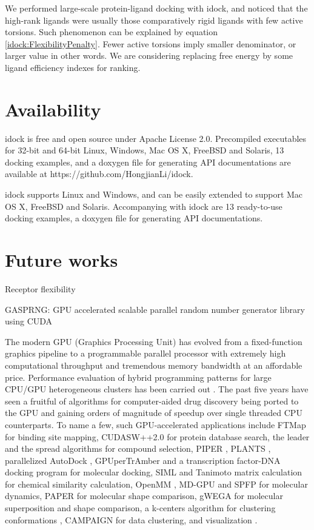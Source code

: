 We performed large-scale protein-ligand docking with idock, and noticed that the high-rank ligands were usually those comparatively rigid ligands with few active torsions. Such phenomenon can be explained by equation \eqref{idock:FlexibilityPenalty}. Fewer active torsions imply smaller denominator, or larger value in other words. We are considering replacing free energy by some ligand efficiency indexes \citep{335,336,337} for ranking.

\section{Availability}

idock is free and open source under Apache License 2.0. Precompiled executables for 32-bit and 64-bit Linux, Windows, Mac OS X, FreeBSD and Solaris, 13 docking examples, and a doxygen file for generating API documentations are available at https://github.com/HongjianLi/idock.

idock supports Linux and Windows, and can be easily extended to support Mac OS X, FreeBSD and Solaris. Accompanying with idock are 13 ready-to-use docking examples, a doxygen file for generating API documentations.

\section{Future works}

Receptor flexibility

\citep{1401} GASPRNG: GPU accelerated scalable parallel random number generator library using CUDA

The modern GPU (Graphics Processing Unit) has evolved from a fixed-function graphics pipeline to a programmable parallel processor with extremely high computational throughput and tremendous memory bandwidth at an affordable price. Performance evaluation of hybrid programming patterns for large CPU/GPU heterogeneous clusters has been carried out \citep{1035}. The past five years have seen a fruitful of algorithms for computer-aided drug discovery being ported to the GPU and gaining orders of magnitude of speedup over single threaded CPU counterparts. To name a few, such GPU-accelerated applications include FTMap \citep{722} for binding site mapping, CUDASW++2.0 \citep{189} for protein database search, the leader and the spread algorithms \citep{750} for compound selection, PIPER \citep{723}, PLANTS \citep{779}, parallelized AutoDock \citep{696}, GPUperTrAmber \citep{1270} and a transcription factor-DNA docking program \citep{1267,1266} for molecular docking, SIML \citep{726} and Tanimoto matrix calculation \citep{881} for chemical similarity calculation, OpenMM \citep{373}, MD-GPU \citep{374} and SPFP \citep{1261} for molecular dynamics, PAPER \citep{491} for molecular shape comparison, gWEGA \citep{1388} for molecular superposition and shape comparison, a k-centers algorithm for clustering conformations \citep{1275}, CAMPAIGN \citep{932} for data clustering, and visualization \citep{986}.

